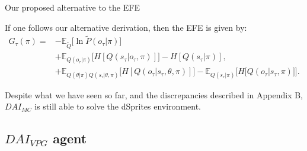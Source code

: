 \documentclass[twoside,11pt]{article}
\makeatletter
\newcounter{subsubsubsection}[subsubsection]
\def\subsubsubsection{\@startsection
     {subsubsubsection}{4}{\z@} {-3.25ex plus -1
     ex minus -.2ex}{1.5ex plus .2ex}{\normalsize\bf}}
\makeatother
\begin{document}
\subsubsubsection{Our proposed alternative to the EFE}

If one follows our alternative derivation, then the EFE is given by:
\begin{align*}
G_{\tau}(\pi) = &- \mathbb{E}_{\tilde{Q}}\Big[ \ln \tilde{P}(o_\tau|\pi)\Big]\\
&+ \mathbb{E}_{Q(o_\tau|\pi)}\Big[ H[Q(s_\tau|o_\tau, \pi)] \Big] - H[Q(s_\tau|\pi)],\\
&+ \mathbb{E}_{Q(\theta|\pi)Q(s_\tau|\theta,\pi)}\Big[H[Q(o_\tau|s_\tau,\theta,\pi)] \Big] - \mathbb{E}_{Q(s_\tau|\pi)}\Big[ H\big[ Q(o_\tau|s_\tau, \pi) \big] \Big].
\end{align*}

Despite what we have seen so far, and the discrepancies described in Appendix B, $DAI_{MC}$ is still able to solve the dSprites environment.

\subsection{$DAI_{VPG}$ agent \citep{DeepAI}}
\end{document}

